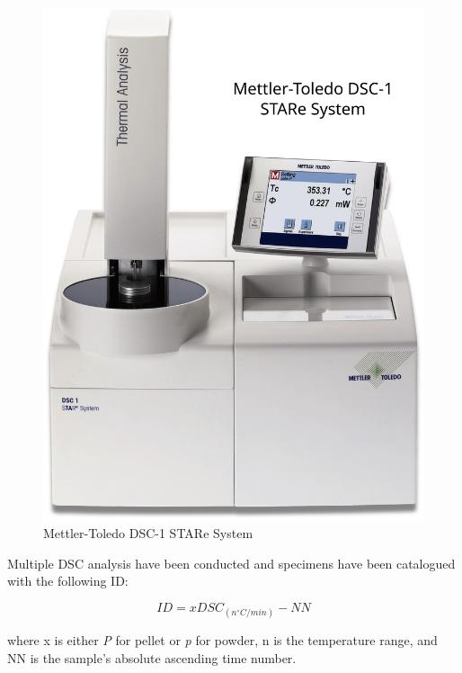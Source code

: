 \documentclass{article}
\begin{document}
                    \begin{figure}[h!]
                        \includegraphics[width=\textwidth]{Pictures/mettler_toledo_DSC1.eps}
                        \caption{Mettler-Toledo DSC-1 STARe System \autocites{Mettler_Toledo}}
                        \label{fig:mettler_toledo_DSC1}
                    \end{figure}

                Multiple DSC analysis have been conducted and specimens have been catalogued with the following ID: 

                \begin{equation}
                    ID = xDSC_{(n ^{\circ}C/min)}-NN
                    \label{eq:DSC_ID}
                \end{equation}

                where x is either \textit{P} for pellet or \textit{p} for powder, n is the temperature range, and NN is the sample's absolute 
                ascending time number. \\
\end{document}
